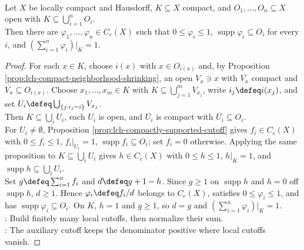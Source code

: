 \begin{proposition} \label{prop:lch-finite-partition-of-unity-compact-set} \\
Let $X$ be locally compact and Hausdorff, $K\subseteq X$ compact, and $O_1,\ldots,O_n\subseteq X$ open with $K\subseteq\bigcup_{i=1}^nO_i$.\\
Then there are $\varphi_1,\ldots,\varphi_n\in C_c(X)$ such that $0\leq\varphi_i\leq1$, $\operatorname{supp}\varphi_i\subseteq O_i$ for every $i$, and $(\sum_{i=1}^n\varphi_i)|_K=1$.
\begin{proof}
For each $x\in K$, choose $i(x)$ with $x\in O_{i(x)}$ and, by Proposition \ref{prop:lch-compact-neighborhood-shrinking}, an open $V_x\ni x$ with $\overline{V_x}$ compact and $\overline{V_x}\subseteq O_{i(x)}$. Choose $x_1,\ldots,x_m\in K$ with $K\subseteq\bigcup_{j=1}^mV_{x_j}$, write $i_j\defeq i(x_j)$, and set $U_i\defeq\bigcup_{\{j:i_j=i\}}V_{x_j}$.\\
Then $K\subseteq\bigcup_iU_i$, each $U_i$ is open, and $\overline{U_i}$ is compact with $\overline{U_i}\subseteq O_i$.\\
For $U_i\neq\emptyset$, Proposition \ref{prop:lch-compactly-supported-cutoff} gives $f_i\in C_c(X)$ with $0\leq f_i\leq1$, $f_i|_{\overline{U_i}}=1$, $\operatorname{supp}f_i\subseteq O_i$; set $f_i=0$ otherwise. Applying the same proposition to $K\subseteq\bigcup_iU_i$ gives $h\in C_c(X)$ with $0\leq h\leq1$, $h|_K=1$, and $\operatorname{supp}h\subseteq\bigcup_iU_i$.\\
Set $g\defeq\sum_{i=1}^nf_i$ and $d\defeq g+1-h$. Since $g\geq1$ on $\operatorname{supp}h$ and $h=0$ off $\operatorname{supp}h$, $d\geq1$. Hence $\varphi_i\defeq f_i/d$ belongs to $C_c(X)$, satisfies $0\leq\varphi_i\leq1$, and has $\operatorname{supp}\varphi_i\subseteq O_i$. On $K$, $h=1$ and $g\geq1$, so $d=g$ and $(\sum_{i=1}^n\varphi_i)|_K=1$.\\
: Build finitely many local cutoffs, then normalize their sum.\\
: The auxiliary cutoff keeps the denominator positive where local cutoffs vanish.
\end{proof}
\end{proposition}

